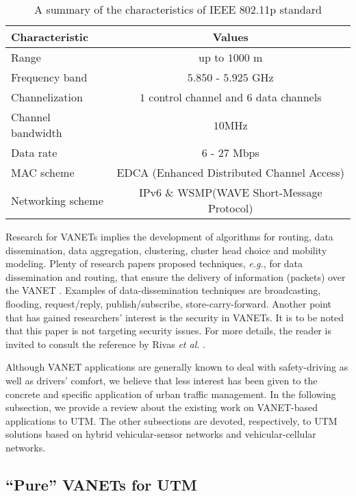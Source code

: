 \documentclass[10pt,onecolumn]{article}
\begin{document}
\begin{table}[h!]
\caption{A summary of the characteristics of IEEE 802.11p standard}
\label{tab.dsrc}
\centering

\begin{tabular}{ | l | c| } 
  \hline      
  \hline
  \textbf{Characteristic} 	& \textbf{Values} 	 \\ 
  \hline      \hline   
  
  Range  	   	& up to $1000$ m 	\\
  Frequency band  	& $5.850$ - $5.925$ GHz \\
  Channelization  	& $1$ control channel and $6$ data channels  \\
  Channel bandwidth  	& $10$MHz 	   	\\
  Data rate  		& $6$ - $27$ Mbps 	\\
  MAC scheme 		& EDCA (Enhanced Distributed Channel Access)  	   \\
  Networking scheme 	& IPv6 \& WSMP(WAVE Short-Message Protocol)  	   \\

   \hline 
   \hline
\end{tabular} 
\end{table}

Research for VANETs implies the development of algorithms for routing, data dissemination, data aggregation, clustering, cluster head choice and mobility modeling.
Plenty of research papers proposed techniques, \textit{e.g.}, for data dissemination and routing, that ensure the delivery of information (packets) over the VANET \cite{Saleet2011}. 
Examples of data-dissemination techniques are broadcasting, flooding, request/reply, publish/subscribe, store-carry-forward.
Another point that has gained researchers' interest is the security in VANETs. It is to be noted that this paper is not targeting security issues. For more details, the reader is invited to consult the reference by Rivas \textit{et al.} \cite{Rivas2011}.

Although VANET applications are generally known to deal with safety-driving as well as drivers' comfort, we believe that less interest has been given to the concrete and specific application of urban traffic management.
In the following subsection, we provide a review about the existing work on VANET-based applications to UTM. The other subsections are devoted, respectively, to UTM solutions based on hybrid vehicular-sensor networks and vehicular-cellular networks. 


\subsection{``Pure'' VANETs for UTM}
\label{vanet4utm}
\end{document}
